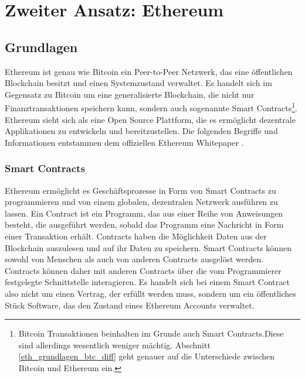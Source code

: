 \chapter{Zweiter Ansatz: Ethereum} %

\label{eth} %

\section{Grundlagen}
Ethereum ist genau wie Bitcoin ein Peer-to-Peer Netzwerk, das eine öffentlichen Blockchain besitzt und einen Systemzustand verwaltet. Es handelt sich im Gegensatz zu Bitcoin um eine generalisierte Blockchain, die nicht nur Finanztransaktionen speichern kann, sondern auch sogenannte Smart Contracts\footnote{Bitcoin Transaktionen beinhalten im Grunde auch Smart Contracts.Diese sind allerdings wesentlich weniger mächtig. Abschnitt \ref{eth_grundlagen_btc_diff} geht genauer auf die Unterschiede zwischen Bitcoin und Ethereum ein.}. Ethereum sieht sich als eine Open Source Plattform, die es ermöglicht dezentrale Applikationen zu entwickeln und bereitzustellen. Die folgenden Begriffe und Informationen entstammen dem offiziellen Ethereum Whitepaper \cite{ethereum_white_paper}.

\subsection{Smart Contracts}
Ethereum ermöglicht es Geschäftsprozesse in Form von Smart Contracts zu programmieren und von einem globalen, dezentralen Netzwerk ausführen zu lassen. Ein Contract ist ein Programm, das aus einer Reihe von Anweisungen besteht, die ausgeführt werden, sobald das Programm eine Nachricht in Form einer Transaktion erhält. Contracts haben die Möglichkeit Daten aus der Blockchain auszulesen und auf ihr Daten zu speichern. Smart Contracts können sowohl von Menschen als auch von anderen Contracts ausgelöst werden. Contracts können daher mit anderen Contracts über die vom Programmierer festgelegte Schnittstelle interagieren. Es handelt sich bei einem Smart Contract also nicht um einen Vertrag, der erfüllt werden muss, sondern um ein öffentliches Stück Software, das den Zustand eines Ethereum Accounts verwaltet.
